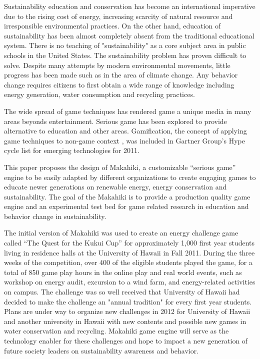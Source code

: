 \documentclass{acm_proc_article-sp}
\begin{document}
Sustainability education and conservation has become an international imperative due to the rising cost of energy, increasing scarcity of natural resource and irresponsible environmental practices. On the other hand, education of sustainability has been almost completely absent from the traditional educational system. There is no teaching of "sustainability" as a core subject area  in public schools in the United States. The sustainability problem has proven difficult to solve. Despite many attempts by modern environmental movements, little progress has been made such as in the area of climate change. Any behavior change requires citizens to first obtain a wide range of knowledge including energy generation, water consumption and recycling practices. 

The wide spread of game techniques has rendered game a unique media in many areas beyonds entertainment. Serious game has been explored to provide alternative to education and other areas. Gamification, the concept of applying game techniques to non-game context \cite{Deterding2011mt}, was included in Gartner Group's Hype cycle list for emerging technologies for 2011. 

This paper proposes the design of Makahiki, a customizable ``serious game'' engine to be easily adapted by different organizations to create engaging games to educate newer generations on renewable energy, energy conservation and sustainability.  The goal of the Makahiki is to provide a production quality game engine and an experimental test bed for game related research in education and behavior change in sustainability.

The initial version of Makahiki was used to create an energy challenge game called ``The Quest for the Kukui Cup'' \cite{csdl2-11-02} for approximately 1,000 first year students living in residence halls at the University of Hawaii in Fall 2011. During the three weeks of the competition, over 400 of the eligible students played the game, for a total of 850 game play hours in the online play and real world events, such as workshop on energy audit, excursion to a wind farm, and energy-related activities on campus. The challenge was so well received that University of Hawaii had decided to make the challenge an "annual tradition" for every first year students. Plans are under way to organize new challenges in 2012 for University of Hawaii and another university in Hawaii with new contents and possible new games in water conservation and recycling. Makahiki game engine will serve as the technology enabler for these challenges and hope to impact a new generation of future society leaders on sustainability awareness and behavior.
\end{document}

